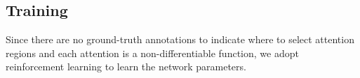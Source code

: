 \documentclass[10pt,twocolumn,letterpaper]{article}
\begin{document}




\subsection{Training}

Since there are no ground-truth annotations to indicate where to select attention regions and each attention is a non-differentiable function, we adopt reinforcement learning to learn the network parameters.
\end{document}
